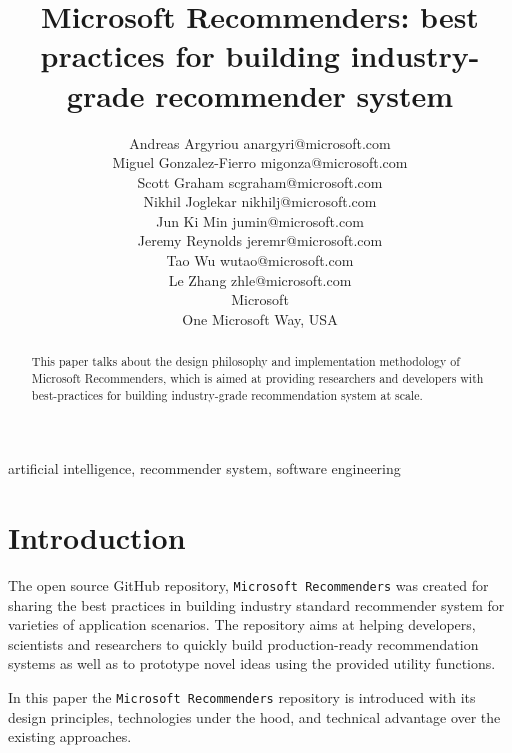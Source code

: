 \documentclass[twoside,11pt]{article}
\begin{document}
\title{Microsoft Recommenders: best practices for building industry-grade recommender system}

\author{\name Andreas Argyriou \email anargyri@microsoft.com \\
  \name Miguel Gonzalez-Fierro \email migonza@microsoft.com \\
  \name Scott Graham \email scgraham@microsoft.com \\
  \name Nikhil Joglekar \email nikhilj@microsoft.com \\
  \name Jun Ki Min \email jumin@microsoft.com \\
  \name Jeremy Reynolds \email jeremr@microsoft.com \\
  \name Tao Wu \email wutao@microsoft.com \\
  \name Le Zhang \email zhle@microsoft.com \\
  \addr Microsoft \\
  One Microsoft Way, USA
}


\maketitle

\begin{abstract}%
  This paper talks about the design philosophy and implementation methodology of Microsoft Recommenders, which is aimed at providing researchers and developers with best-practices for building  industry-grade recommendation system at scale.
\end{abstract}

\begin{keywords}
  artificial intelligence, recommender system, software engineering
\end{keywords}

\section{Introduction}
The open source GitHub repository, \verb|Microsoft Recommenders| was created for sharing the best practices in building industry standard recommender system for varieties of application scenarios. The repository aims at helping developers, scientists and researchers to quickly build production-ready recommendation systems as well as to prototype novel ideas using the provided utility functions.

In this paper the \verb|Microsoft Recommenders| repository is introduced with its design principles, technologies under the hood, and technical advantage over the existing approaches.
\end{document}
